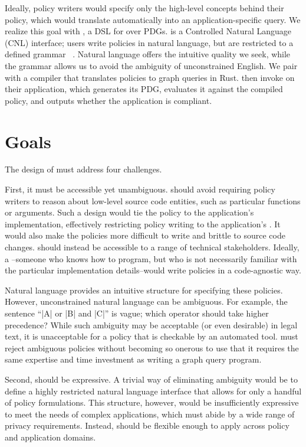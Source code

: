 Ideally, policy writers would specify only the high-level concepts behind their policy,
which \sys{} would translate automatically into an application-specific query.
%
We realize this goal with \syslang{}, a DSL for \policies{} over PDGs.
%
\syslang{} is a Controlled Natural Language (CNL) interface; users write policies in natural language, 
but are restricted to a defined grammar ~\cite{cnl-def}.
%
Natural language offers the intuitive quality we seek, 
while the grammar allows us to avoid the ambiguity of unconstrained English.
%
We pair \syslang{} with a compiler that translates policies to \sys{} graph queries in Rust.
%
\Devs{} then invoke \sys{} on their application,
which generates its PDG, evaluates it against the compiled \syslang{} policy,
and outputs whether the application is compliant.
%

\section{Goals}
The design of \syslang{} must address four challenges.

First, it must be accessible yet unambiguous.
%
\syslang{} should avoid requiring policy writers to reason about low-level source code entities, 
such as particular functions or arguments.
%
Such a design would tie the policy to the application's implementation, 
effectively restricting policy writing to the application's \devs.
%
It would also make the policies more difficult to write and brittle to source code changes.
%
\syslang{} should instead be accessible to a range of technical stakeholders.
%
Ideally, a \ce--someone who knows how to program, 
but who is not necessarily familiar with the particular implementation details--would write policies in a code-agnostic way.
%

Natural language provides an intuitive structure for specifying these policies.
%
However, unconstrained natural language can be ambiguous.
%
For example, the sentence ``|A| or |B| and |C|'' is vague; which operator should take higher precedence?
%
While such ambiguity may be acceptable (or even desirable) in legal text,
it is unacceptable for a policy that is checkable by an automated tool.
%
\syslang{} must reject ambiguous policies without becoming so onerous to use that it 
requires the same expertise and time investment as writing a graph query program.

Second, \syslang{} should be expressive.
%
A trivial way of eliminating ambiguity would be to define a highly restricted natural language interface that allows for only a handful of policy formulations.
%
This structure, however, would be insufficiently expressive to meet the needs of complex applications, 
which must abide by a wide range of privacy requirements.
%
Instead, \syslang{} should be flexible enough to apply across policy and application domains.


